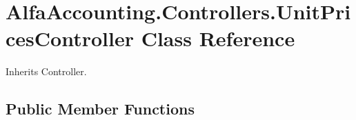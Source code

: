 \hypertarget{class_alfa_accounting_1_1_controllers_1_1_unit_prices_controller}{}\section{Alfa\+Accounting.\+Controllers.\+Unit\+Prices\+Controller Class Reference}
\label{class_alfa_accounting_1_1_controllers_1_1_unit_prices_controller}


 




Inherits Controller.

\subsection*{Public Member Functions}

